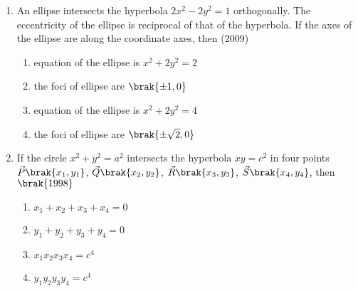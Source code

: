 \begin{enumerate}[label=\thesubsection.\arabic*.,ref=\thesubsection.\theenumi]
	\hfill{}
\item An ellipse intersects the hyperbola $2x^2-2y^2=1$ orthogonally. The eccentricity of the ellipse is reciprocal of that of the hyperbola. If the axes of the ellipse are along the coordinate axes, then \hfill(2009)
		\begin{multicols}{2}
\begin{enumerate}
			\item equation of the ellipse is $x^2+2y^2=2$
			\item the foci of ellipse are $\brak{\pm1,0}$
			\item equation of the ellipse is $x^2+2y^2=4$
			\item the foci of ellipse are $\brak{\pm\sqrt{2},0}$
		\end{enumerate}
\end{multicols}

\item If the circle $x^2+y^2=a^2$ intersects the hyperbola $xy=c^2$ in four points $\vec{P}\brak{x_1, y_1}$, $\vec{Q}\brak{x_2, y_2}$, $\vec{R}\brak{x_3, y_3}$, $\vec{S}\brak{x_4, y_4}$, then
%
    \hfill$\brak{1998}$
\begin{multicols}{2}
\begin{enumerate}
    \item $x_1+x_2+x_3+x_4=0$
    \item $y_1+y_2+y_3+y_4=0$
    \item $x_1x_2x_3x_4=c^4$
    \item $y_1y_2y_3y_4=c^4$
%
\end{enumerate}
\end{multicols}
\end{enumerate}

